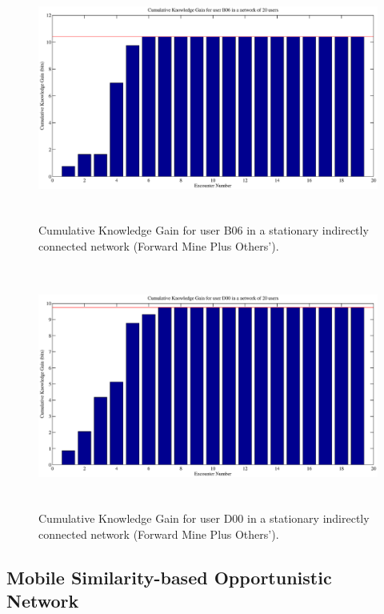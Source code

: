 \documentclass[11pt]{article}
\begin{document}
\begin{itemize}
    
      \begin{figure}[!bp]
	\centering
     \includegraphics[width=15cm ,height=8cm]{figures_eps/B06_SMHOP_MO}
    \caption{Cumulative Knowledge Gain for user B06 in a stationary indirectly connected network (Forward Mine Plus Others').}\label{fig:B06_SMHOP_MO)}
    \end{figure}
    
    
      \begin{figure}[!bp]
	\centering
     \includegraphics[width=15cm ,height=8cm]{figures_eps/D00_SMHOP_MO}
    \caption{Cumulative Knowledge Gain for user D00 in a stationary indirectly connected network (Forward Mine Plus Others').}\label{fig:D00_SMHOP_MO)}
    \end{figure}
\end{itemize}
\subsection{Mobile Similarity-based Opportunistic Network}
\end{document}

